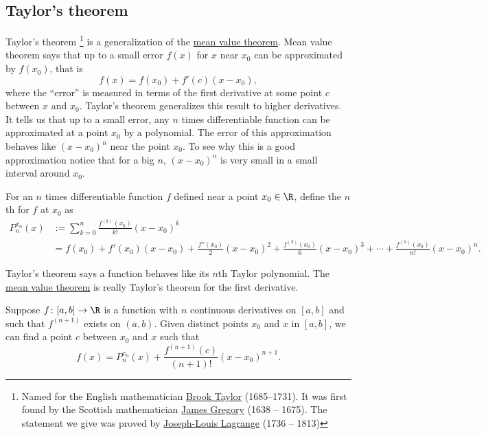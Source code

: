 \documentclass[12pt]{book}
\begin{document}
\subsection*{Taylor's theorem}

Taylor's theorem%
\footnote{Named for the English mathematician
\href{http://en.wikipedia.org/wiki/Brook_Taylor}{Brook Taylor}
(1685--1731).
It was first found by
the Scottish mathematician
\href{http://en.wikipedia.org/wiki/James_Gregory_(mathematician)}{James Gregory}
(1638 -- 1675).
The statement we give
was proved by
\href{http://en.wikipedia.org/wiki/Lagrange}{Joseph-Louis Lagrange}
(1736 -- 1813)}
is a generalization of the \hyperref[thm:mvt]{mean value theorem}.
Mean value theorem says that up to a small error $f(x)$ for $x$ near $x_0$ can be
approximated by $f(x_0)$, that is
\begin{equation*}
f(x) = f(x_0) + f'(c)(x-x_0),
\end{equation*}
where the ``error'' is measured in terms of the first derivative
at some point $c$ between $x$ and $x_0$.
Taylor's theorem generalizes this result to higher derivatives.
It tells us that up to a small error, any $n$
times differentiable function can be approximated at a point $x_0$
by a polynomial.
The
error of this approximation behaves like ${(x-x_0)}^{n}$ near the point $x_0$.
To see why this is a good approximation notice that for a big $n$, 
${(x-x_0)}^n$ is very small in a small interval around $x_0$.

\begin{defn}
For an $n$ times differentiable function $f$ defined near a point $x_0 \in \R$, define the
$n$th \emph{}%
for $f$ at $x_0$ as
\begin{equation*}
\begin{split}
P_n^{x_0}(x)
& :=
\sum_{k=0}^n
\frac{f^{(k)}(x_0)}{k!}{(x-x_0)}^k
\\
& =
f(x_0)
+ f'(x_0)(x-x_0)
+ \frac{f''(x_0)}{2}{(x-x_0)}^2
+ \frac{f^{(3)}(x_0)}{6}{(x-x_0)}^3
+ \cdots
+ \frac{f^{(n)}(x_0)}{n!}{(x-x_0)}^n .
\end{split}
\end{equation*}
\end{defn}

Taylor's theorem says a function behaves like its $n$th
Taylor polynomial.
The 
\hyperref[thm:mvt]{mean value theorem} is really Taylor's theorem
for the first derivative.

\begin{thm}[Taylor] \label{thm:taylor}
Suppose $f \colon [a,b] \to \R$ is a function with $n$ continuous
derivatives on $[a,b]$ and such that $f^{(n+1)}$ exists on $(a,b)$.
Given distinct points $x_0$ and $x$ in $[a,b]$,
we can find a point $c$ between $x_0$
and $x$ such that
\begin{equation*}
f(x)=P_{n}^{x_0}(x)+\frac{f^{(n+1)}(c)}{(n+1)!}{(x-x_0)}^{n+1} .
\end{equation*}
\end{thm}
\end{document}
